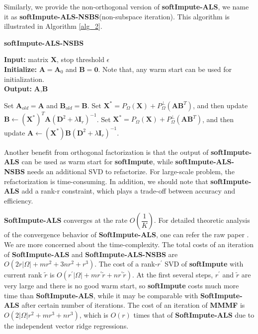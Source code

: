 \documentclass[11pt]{article}
\begin{document}
Similarly, we provide the non-orthogonal version of \textbf{softImpute-ALS}, we name it as \textbf{softImpute-ALS-NSBS}(non-subspace iteration). This algorithm is illustrated in Algorithm \ref{alg_2}.

	\begin{algorithm}[h]
	\caption{\small \textbf{softImpute-ALS-NSBS}}
	\label{alg_2}
	\textbf{Input:} matrix $\boldsymbol{X}$, stop threshold $\epsilon$\\
	\textbf{Initialize:} $\boldsymbol{A}=\boldsymbol{A}_0$ and $\boldsymbol{B}=\boldsymbol{0}$. Note that, any warm start can be used for initialization.\\
	\textbf{Output:} $\boldsymbol{A}$,$\boldsymbol{B}$
	\begin{algorithmic}
		\Repeat
		\State Set $\boldsymbol{A}_{old}=\boldsymbol{A}$ and $\boldsymbol{B}_{old}=\boldsymbol{B}$.
		\State Set $\boldsymbol{X}^*=P_{\Omega}(\boldsymbol{X})+P_{\Omega}^{\perp}(\boldsymbol{A}\boldsymbol{B}^T)$, and then update $\boldsymbol{B}\leftarrow (\boldsymbol{X}^*)^T\boldsymbol{A}(\boldsymbol{D}^2+\lambda\boldsymbol{I}_r)^{-1}$.
		\State Set $\boldsymbol{X}^*=P_{\Omega}(\boldsymbol{X})+P_{\Omega}^{\perp}(\boldsymbol{A}\boldsymbol{B}^T)$, and then update $\boldsymbol{A}\leftarrow (\boldsymbol{X}^*)\boldsymbol{B}(\boldsymbol{D}^2+\lambda\boldsymbol{I}_r)^{-1}$.

	\end{algorithmic}
\end{algorithm}

Another benefit from orthogonal factorization is that the output of \textbf{softImpute-ALS} can be used as warm start for \textbf{softImpute}, while \textbf{softImpute-ALS-NSBS} needs an additional SVD to refactorize. For large-scale problem, the refactorization is time-consuming. In addition, we should note that \textbf{softImpute-ALS} add a rank-r constraint, which plays a trade-off between accuracy and efficiency. 

\textbf{SoftImpute-ALS} converges at the rate $O(\dfrac{1}{K})$. For detailed theoretic analysis of the convergence behavior of \textbf{SoftImpute-ALS}, one can refer the raw paper \citep{hastie2015matrix}. We are more concerned about the time-complexity. 
The total costs of an iteration of \textbf{SoftImpute-ALS} and \textbf{SoftImpute-ALS-NSBS}  are $O(2r|\Omega| + mr^2 +3nr^2 + r^3)$. The cost of a rank-$r^{\prime}$ SVD of \textbf{softImpute} with current rank $\tilde{r}$ is $O(r^{\prime}|\Omega| + mr^{\prime}\tilde{r} +nr^{\prime}\tilde{r})$. At the first several steps, $r^{\prime}$ and $\tilde{r}$ are very large and there is no good warm start, so \textbf{softImpute} costs much more time than \textbf{SoftImpute-ALS}, while it may be comparable with \textbf{SoftImpute-ALS} after certain number of iterations. The cost of an iteration of \textbf{MMMF} is $O(2|\Omega|r^2 + mr^3 + nr^3)$, which is $O(r)$ times that of  \textbf{SoftImpute-ALS} due to the independent vector ridge regressions.
\end{document}
